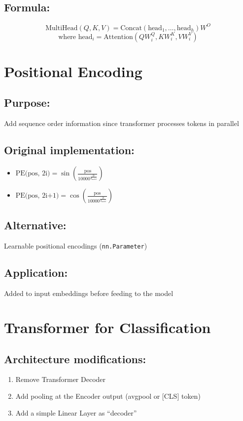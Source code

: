 \subsection*{Formula:}
\[
\text{MultiHead}(Q, K, V) = \text{Concat}(\text{head}_1, \ldots, \text{head}_h) W^O
\]
\[
\text{where head}_i = \text{Attention}(Q W_i^Q, K W_i^K, V W_i^V)
\]

\section{Positional Encoding}

\subsection*{Purpose:}
Add sequence order information since transformer processes tokens in parallel

\subsection*{Original implementation:}
\begin{itemize}
    \item $\text{PE(pos, 2i)} = \sin\left(\frac{\text{pos}}{10000^{\frac{2i}{d_{\text{model}}}}}\right)$
    \item $\text{PE(pos, 2i+1)} = \cos\left(\frac{\text{pos}}{10000^{\frac{2i}{d_{\text{model}}}}}\right)$
\end{itemize}

\subsection*{Alternative:}
Learnable positional encodings (\texttt{nn.Parameter})

\subsection*{Application:}
Added to input embeddings before feeding to the model

\section{Transformer for Classification}

\subsection*{Architecture modifications:}
\begin{enumerate}
    \item Remove Transformer Decoder
    \item Add pooling at the Encoder output (avgpool or [CLS] token)
    \item Add a simple Linear Layer as ``decoder''
\end{enumerate}

